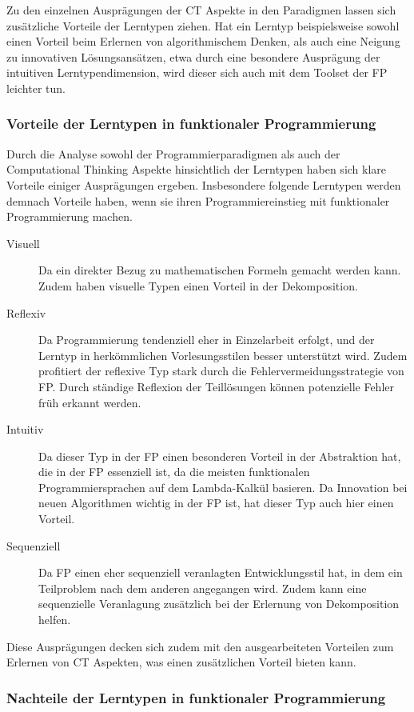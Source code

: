 Zu den einzelnen Ausprägungen der CT Aspekte in den Paradigmen lassen sich zusätzliche Vorteile der Lerntypen ziehen.
Hat ein Lerntyp beispielsweise sowohl einen Vorteil beim Erlernen von algorithmischem Denken, als auch eine Neigung zu innovativen Lösungsansätzen, etwa durch eine besondere Ausprägung der intuitiven Lerntypendimension, wird dieser sich auch mit dem Toolset der FP leichter tun.

\subsubsection{Vorteile der Lerntypen in funktionaler Programmierung}
Durch die Analyse sowohl der Programmierparadigmen als auch der Computational Thinking Aspekte hinsichtlich der Lerntypen haben sich klare Vorteile einiger Ausprägungen ergeben.
Insbesondere folgende Lerntypen werden demnach Vorteile haben, wenn sie ihren Programmiereinstieg mit funktionaler Programmierung machen.

\begin{description}
    \item[Visuell] Da ein direkter Bezug zu mathematischen Formeln gemacht werden kann. Zudem haben visuelle Typen einen Vorteil in der Dekomposition.
    \item[Reflexiv] Da Programmierung tendenziell eher in Einzelarbeit erfolgt, und der Lerntyp in herkömmlichen Vorlesungsstilen besser unterstützt wird. Zudem profitiert der reflexive Typ stark durch die Fehlervermeidungsstrategie von FP. Durch ständige Reflexion der Teillösungen können potenzielle Fehler früh erkannt werden.
    \item[Intuitiv] Da dieser Typ in der FP einen besonderen Vorteil in der Abstraktion hat, die in der FP essenziell ist, da die meisten funktionalen Programmiersprachen auf dem Lambda-Kalkül basieren. Da Innovation bei neuen Algorithmen wichtig in der FP ist, hat dieser Typ auch hier einen Vorteil.
    \item[Sequenziell] Da FP einen eher sequenziell veranlagten Entwicklungsstil hat, in dem ein Teilproblem nach dem anderen angegangen wird. Zudem kann eine sequenzielle Veranlagung zusätzlich bei der Erlernung von Dekomposition helfen.
\end{description}

Diese Ausprägungen decken sich zudem mit den ausgearbeiteten Vorteilen zum Erlernen von CT Aspekten, was einen zusätzlichen Vorteil bieten kann.
\\
\subsubsection{Nachteile der Lerntypen in funktionaler Programmierung}

